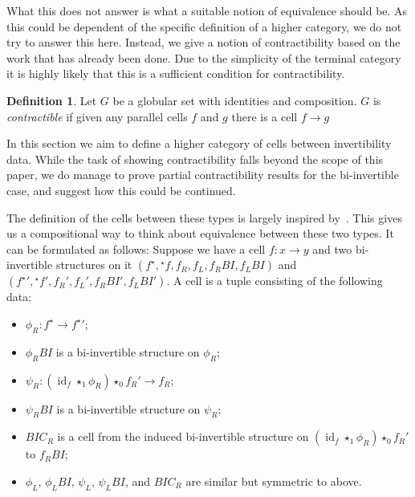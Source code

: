 \documentclass{article}
\theoremstyle{definition}
\newtheorem{definition}{Definition}
\theoremstyle{remark}
\DeclareMathOperator{\id}{id}
\newcommand{\linv}[1]{{}^\star\!#1}
\newcommand{\rinv}[1]{#1^\star}
\newcommand{\comp}{\star}
\begin{document}
What this does not answer is what a suitable notion of equivalence should be. As this could be dependent of the specific definition of a higher category, we do not try to answer this here. Instead, we give a notion of contractibility based on the work that has already been done. Due to the simplicity of the terminal category it is highly likely that this is a sufficient condition for contractibility.

\begin{definition}
  Let \(G\) be a globular set with identities and composition. \(G\) is \emph{contractible} if given any parallel cells \(f\) and \(g\) there is a cell \(f \to g\)
\end{definition}

In this section we aim to define a higher category of cells between invertibility data. While the task of showing contractibility falls beyond the scope of this paper, we do manage to prove partial contractibility results for the bi-invertible case, and suggest how this could be continued.

The definition of the cells between these types is largely inspired by~\cite[Lemma 4.2.5]{hottbook}. This gives us a compositional way to think about equivalence between these two types. It can be formulated as follows: Suppose we have a cell \(f : x \to y\) and two bi-invertible structures on it \((\rinv f, \linv f, f_R, f_L, f_R{}BI, f_L{}BI)\) and \((\rinv f{}' , \linv f{}', f_R', f_L', f_R{}BI', f_L{}BI')\). A cell is a tuple consisting of the following data:
\begin{itemize}
\item \(\phi_R : \rinv f \to \rinv f{}'\);
\item \(\phi_R{}BI\) is a bi-invertible structure on \(\phi_R\);
\item \(\psi_R : (\id_f \comp_1 \phi_R) \comp_0 f_R' \to f_R\);
\item \(\psi_R{}BI\) is a bi-invertible structure on \(\psi_R\);
\item \(BIC_R\) is a cell from the induced bi-invertible structure on \((\id_f \comp_1 \phi_R) \comp_0 f_R'\) to \(f_R{}BI\);
\item \(\phi_L\), \(\phi_L{}BI\), \(\psi_L\), \(\psi_L{}BI\), and \(BIC_R\) are similar but symmetric to above.
\end{itemize}
\end{document}
